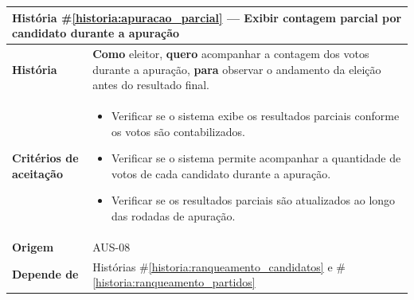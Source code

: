 \documentclass[12pt,a4paper]{article}
\newcounter{historia}
\begin{document}
\label{historia:apuracao_parcial}
\begin{table}[H]
    \centering
    \begin{tabular}{|m{4.5cm} | m{11cm}|}
    \hline
    
    \multicolumn{2}{|l|}{\textbf{História \#\ref{historia:apuracao_parcial} --- Exibir contagem parcial por candidato durante a apuração}} \\
    
    \hline \textbf{História} &
    \textbf{Como} eleitor,
    \newline
    \textbf{quero} acompanhar a contagem dos votos durante a apuração,
    \newline
    \textbf{para} observar o andamento da eleição antes do resultado final. \\
    
    \textbf{Critérios de aceitação} &
    \begin{itemize}
        \item{Verificar se o sistema exibe os resultados parciais conforme os votos são contabilizados.}
        \item{Verificar se o sistema permite acompanhar a quantidade de votos de cada candidato durante a apuração.}
        \item{Verificar se os resultados parciais são atualizados ao longo das rodadas de apuração.}
    \end{itemize}\\
    
    \textbf{Origem} &
    AUS-08 \\
    
    \textbf{Depende de} &
    Histórias \#\ref{historia:ranqueamento_candidatos} e \#\ref{historia:ranqueamento_partidos} \\
    
    \hline
    \end{tabular}
\end{table}
\end{document}
